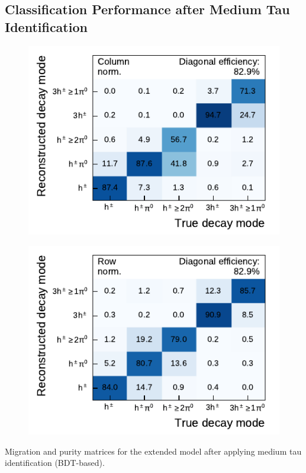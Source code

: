 \subsection{Classification Performance after Medium Tau Identification}

\noindent
\begin{minipage}{\textwidth}
  \captionsetup{type=figure}
  \begin{subfigure}{0.48\textwidth}
    \centering
    \includegraphics{./figures/decay_mode_classification/combined_sub_e_moments_shots_conv_ptcut_1_5/mig_mat_med_id.pdf}
  \end{subfigure}\hfill
  \begin{subfigure}{0.48\textwidth}
    \centering
    \includegraphics{./figures/decay_mode_classification/combined_sub_e_moments_shots_conv_ptcut_1_5/comp_mat_med_id.pdf}
  \end{subfigure}
  \caption[Migration and purity matrices for the extended model after medium tau
  identification]{Migration and purity matrices for the extended model after
    applying medium tau identification (BDT-based).}
  \label{fig:decay_mode_combined_med_id}
\end{minipage}


